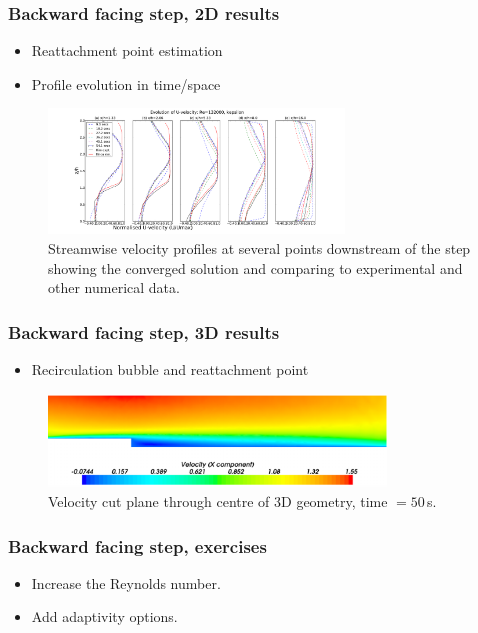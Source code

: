 %
\begin{frame}
    \frametitle{Backward facing step, 2D results}
\begin{itemize}
\item Reattachment point estimation
\item Profile evolution in time/space
\end{itemize}
\begin{figure}
\centering
\includegraphics[width=0.7\textwidth]{./backward_facing_step/velocity_profiles_kim_kepsilon}
\caption{Streamwise velocity profiles at several points downstream of the step showing the converged solution and comparing to experimental and other numerical data.}
\end{figure}

\end{frame}
%
\begin{frame}
    \frametitle{Backward facing step, 3D results}
\begin{itemize}
\item Recirculation bubble and reattachment point
\end{itemize}

\begin{figure}
\centering
\includegraphics[width=0.8\textwidth]{./backward_facing_step/velo-magnitude-3d-50sec}
\caption{Velocity cut plane through centre of 3D geometry, time $=50\,$s.}
\end{figure}

\end{frame}
%
\begin{frame}
    \frametitle{Backward facing step, exercises}
\begin{itemize}
\item Increase the Reynolds number.
\item Add adaptivity options.
\end{itemize}

\end{frame}
